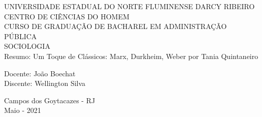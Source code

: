 \begin{center}
    {\large UNIVERSIDADE ESTADUAL DO NORTE FLUMINENSE DARCY RIBEIRO}
    \\[0.2cm]
    {\large CENTRO DE CIÊNCIAS DO HOMEM}
    \\[0.2cm]
    {\large CURSO DE GRADUAÇÃO DE BACHAREL EM ADMINISTRAÇÃO PÚBLICA}
    \\[0.2cm]
    {\large SOCIOLOGIA}
    \\[8cm]
    { \huge Resumo: Um Toque de Clássicos: Marx, Durkheim, Weber por Tania Quintaneiro}
    \\[4cm]
\end{center}

\begin{flushleft}
    Docente: João Boechat\\[.2cm]
    Discente: Wellington Silva\\[4cm]
\end{flushleft}

\begin{center}
    {\large Campos dos Goytacazes - RJ}\\[0.2cm]
    {\large Maio - 2021}
\end{center}